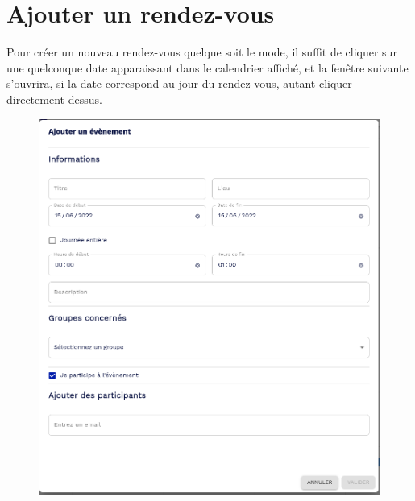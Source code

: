\section*{Ajouter un rendez-vous}
Pour créer un nouveau rendez-vous quelque soit le mode, il suffit de cliquer sur une quelconque date apparaissant dans le calendrier affiché, et la fenêtre suivante s'ouvrira, si la date correspond au jour du rendez-vous, autant cliquer directement dessus.
\begin{figure}
	\centering
	\includegraphics[width=0.500\linewidth]{./Captures/agenda.neo.rdv.png}
\end{figure}

